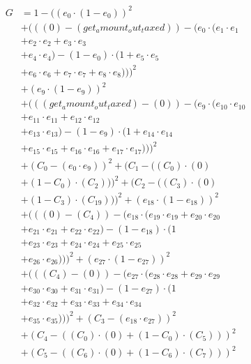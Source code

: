 \documentclass[10pt, a4paper]{article}
\begin{document}
\begin{small}
\begin{align*}
G &= 1 - ((e_{0} \cdot (1 - e_{0}))^{2} \\
& + (((0) - (get_amount_out_taxed)) - (e_{0} \cdot (e_{1} \cdot e_{1} \\
& + e_{2} \cdot e_{2} + e_{3} \cdot e_{3} \\
& + e_{4} \cdot e_{4}) - (1 - e_{0}) \cdot (1 + e_{5} \cdot e_{5} \\
& + e_{6} \cdot e_{6} + e_{7} \cdot e_{7} + e_{8} \cdot e_{8})))^{2} \\
& + (e_{9} \cdot (1 - e_{9}))^{2} \\
& + (((get_amount_out_taxed) - (0)) - (e_{9} \cdot (e_{10} \cdot e_{10} \\
& + e_{11} \cdot e_{11} + e_{12} \cdot e_{12} \\
& + e_{13} \cdot e_{13}) - (1 - e_{9}) \cdot (1 + e_{14} \cdot e_{14} \\
& + e_{15} \cdot e_{15} + e_{16} \cdot e_{16} + e_{17} \cdot e_{17})))^{2} \\
& + (C_{0} - (e_{0} \cdot e_{9}))^{2} + (C_{1} - ((C_{0})  \cdot  (0) \\
& + (1 - C_{0})  \cdot  (C_{2})))^{2} + (C_{2} - ((C_{3})  \cdot  (0) \\
& + (1 - C_{3})  \cdot  (C_{19})))^{2} + (e_{18} \cdot (1 - e_{18}))^{2} \\
& + (((0) - (C_{4})) - (e_{18} \cdot (e_{19} \cdot e_{19} + e_{20} \cdot e_{20} \\
& + e_{21} \cdot e_{21} + e_{22} \cdot e_{22}) - (1 - e_{18}) \cdot (1 \\
& + e_{23} \cdot e_{23} + e_{24} \cdot e_{24} + e_{25} \cdot e_{25} \\
& + e_{26} \cdot e_{26})))^{2} + (e_{27} \cdot (1 - e_{27}))^{2} \\
& + (((C_{4}) - (0)) - (e_{27} \cdot (e_{28} \cdot e_{28} + e_{29} \cdot e_{29} \\
& + e_{30} \cdot e_{30} + e_{31} \cdot e_{31}) - (1 - e_{27}) \cdot (1 \\
& + e_{32} \cdot e_{32} + e_{33} \cdot e_{33} + e_{34} \cdot e_{34} \\
& + e_{35} \cdot e_{35})))^{2} + (C_{3} - (e_{18} \cdot e_{27}))^{2} \\
& + (C_{4} - ((C_{0})  \cdot  (0) + (1 - C_{0})  \cdot  (C_{5})))^{2} \\
& + (C_{5} - ((C_{6})  \cdot  (0) + (1 - C_{6})  \cdot  (C_{7})))^{2} \\

\end{align*}
\end{small}
\end{document}
